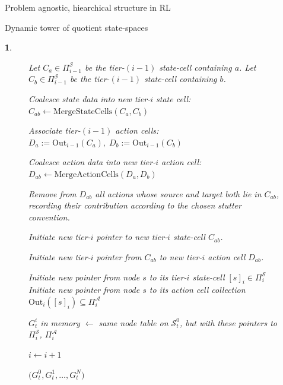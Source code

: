 \documentclass[11pt]{article}
\newtheorem{ermark}[subsubsection]{}
\begin{document}
\begin{section}{Problem agnostic, hiearchical structure in RL}
\begin{subsection}{Dynamic tower of quotient state-spaces}
\begin{ermark}
\begin{figure}[!h]
\begin{algorithm}[H]
\begin{algorithmic}[1]
            \State Let $C_a\in\Pi_{i-1}^{\mathcal S}$ be the tier-$(i-1)$ state-cell containing $a$.
            \State Let $C_b\in\Pi_{i-1}^{\mathcal S}$ be the tier-$(i-1)$ state-cell containing $b$.

                \State Coalesce state data into new tier-$i$ state cell:
                $
                C_{ab}\gets \mathrm{MergeStateCells}(C_a,C_b)
                $

                \State  Associate tier-$(i-1)$ action cells: $D_a:=\mathrm{Out}_{i-1}(C_a),\;D_b:=\mathrm{Out}_{i-1}(C_b)$

                \State Coalesce action data into new tier-$i$ action cell:
                $
                D_{ab}\gets \mathrm{MergeActionCells}(D_a,D_b)
                $
                
                \State Remove from $D_{ab}$ all actions whose source and target both lie in $C_{ab}$, recording their contribution according to the chosen stutter convention.

                \State Initiate new tier-$i$ pointer to new tier-$i$ state-cell $C_{ab}$.

                \State Initiate new tier-$i$ pointer from $C_{ab}$ to new tier-$i$ action cell $D_{ab}$.
                \EndFor
            \EndIf
        \EndFor

            \State Initiate new pointer from node $s$  to its tier-$i$ state-cell $[s]_i\in\Pi_i^{\mathcal S}$
            \State Initiate new pointer from node $s$  to its action cell collection $\mathrm{Out}_i([s]_i)\subseteq\Pi_i^{\mathcal A}$
        \EndFor

        \State $G_t^i$ in memory $\gets$ same node table on $\mathcal{S}_t^0$, but with these pointers to $\Pi_i^{\mathcal S}$, $\Pi_i^{\mathcal A}$

        \State $i \gets i+1$

    \EndWhile

    \State \Return $\bigl(
    G_t^0,G_t^1,\dots,G_t^N
    \bigr)$
\EndFunction

\end{algorithmic}
\end{algorithm}
    \label{fig: algorithm 1}
\end{figure}

\end{ermark}


\end{subsection}
\end{section}
\end{document}
